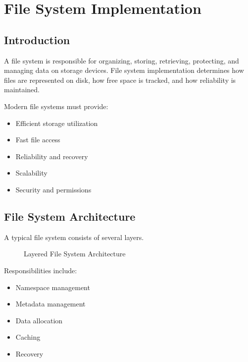 \chapter{File System Implementation}

\section{Introduction}

A file system is responsible for organizing, storing, retrieving, protecting, and managing data on storage devices. File system implementation determines how files are represented on disk, how free space is tracked, and how reliability is maintained.

Modern file systems must provide:

\begin{itemize}
\item Efficient storage utilization
\item Fast file access
\item Reliability and recovery
\item Scalability
\item Security and permissions
\end{itemize}

\section{File System Architecture}

A typical file system consists of several layers.

\begin{figure}[H]
\centering
{}
\caption{Layered File System Architecture}
\end{figure}

Responsibilities include:

\begin{itemize}
\item Namespace management
\item Metadata management
\item Data allocation
\item Caching
\item Recovery
\end{itemize}

